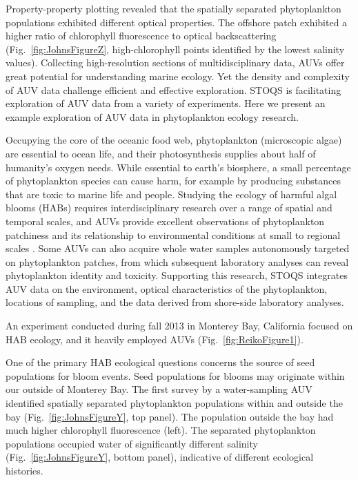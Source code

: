 \documentclass[conference]{IEEEtran}
\begin{document}
Property-property plotting revealed that the spatially separated phytoplankton populations exhibited different optical properties.  The offshore patch exhibited a higher ratio of chlorophyll fluorescence to optical backscattering (Fig.~\ref{fig:JohnsFigureZ}, high-chlorophyll points identified by the lowest salinity values).
Collecting high-resolution sections of multidisciplinary data, AUVs offer great potential for understanding marine ecology.  Yet the density and complexity of AUV data challenge efficient and effective exploration.  STOQS is facilitating exploration of AUV data from a variety of experiments.  Here we present an example exploration of AUV data in phytoplankton ecology research.

Occupying the core of the oceanic food web, phytoplankton (microscopic algae) are essential to ocean life, and their photosynthesis supplies about half of humanity’s oxygen needs.  While essential to earth’s biosphere, a small percentage of phytoplankton species can cause harm, for example by producing substances that are toxic to marine life and people.  Studying the ecology of harmful algal blooms (HABs) requires interdisciplinary research over a range of spatial and temporal scales, and AUVs provide excellent observations of phytoplankton patchiness and its relationship to environmental conditions at small to regional scales \cite{Scholin2000}.  Some AUVs can also acquire whole water samples autonomously targeted on phytoplankton patches, from which subsequent laboratory analyses can reveal phytoplankton identity and toxicity.  Supporting this research, STOQS integrates AUV data on the environment, optical characteristics of the phytoplankton, locations of sampling, and the data derived from shore-side laboratory analyses.

An experiment conducted during fall 2013 in Monterey Bay, California focused on HAB ecology, and it heavily employed AUVs (Fig.~\ref{fig:ReikoFigure1}).  

One of the primary HAB ecological questions concerns the source of seed populations for bloom events.  Seed populations for blooms may originate within our outside of Monterey Bay.  The first survey by a water-sampling AUV identified spatially separated phytoplankton populations within and outside the bay (Fig.~\ref{fig:JohnsFigureY}, top panel).  The population outside the bay had much higher chlorophyll fluorescence (left).  The separated phytoplankton populations occupied water of significantly different salinity (Fig.~\ref{fig:JohnsFigureY}, bottom panel), indicative of different ecological histories.
\end{document}
